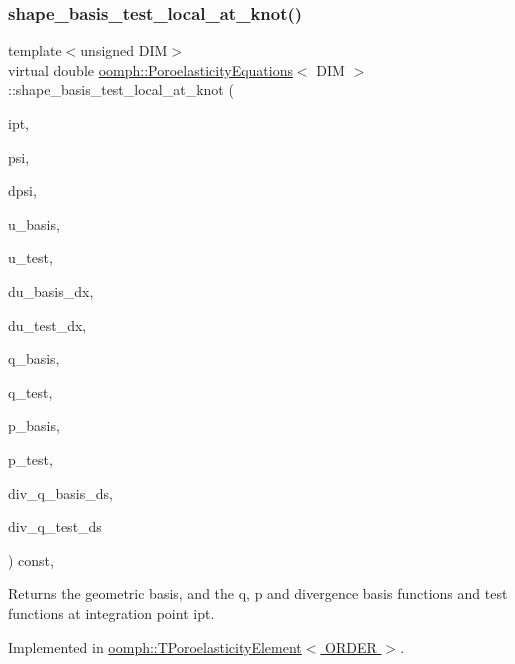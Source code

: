 \subsubsection{\texorpdfstring{shape\+\_\+basis\+\_\+test\+\_\+local\+\_\+at\+\_\+knot()}{shape\_basis\_test\_local\_at\_knot()}}
{\footnotesize\ttfamily template$<$unsigned D\+IM$>$ \\
virtual double \hyperlink{classoomph_1_1PoroelasticityEquations}{oomph\+::\+Poroelasticity\+Equations}$<$ D\+IM $>$\+::shape\+\_\+basis\+\_\+test\+\_\+local\+\_\+at\+\_\+knot (\begin{DoxyParamCaption}\item[{const unsigned \&}]{ipt,  }\item[{\hyperlink{classoomph_1_1Shape}{Shape} \&}]{psi,  }\item[{\hyperlink{classoomph_1_1DShape}{D\+Shape} \&}]{dpsi,  }\item[{\hyperlink{classoomph_1_1Shape}{Shape} \&}]{u\+\_\+basis,  }\item[{\hyperlink{classoomph_1_1Shape}{Shape} \&}]{u\+\_\+test,  }\item[{\hyperlink{classoomph_1_1DShape}{D\+Shape} \&}]{du\+\_\+basis\+\_\+dx,  }\item[{\hyperlink{classoomph_1_1DShape}{D\+Shape} \&}]{du\+\_\+test\+\_\+dx,  }\item[{\hyperlink{classoomph_1_1Shape}{Shape} \&}]{q\+\_\+basis,  }\item[{\hyperlink{classoomph_1_1Shape}{Shape} \&}]{q\+\_\+test,  }\item[{\hyperlink{classoomph_1_1Shape}{Shape} \&}]{p\+\_\+basis,  }\item[{\hyperlink{classoomph_1_1Shape}{Shape} \&}]{p\+\_\+test,  }\item[{\hyperlink{classoomph_1_1Shape}{Shape} \&}]{div\+\_\+q\+\_\+basis\+\_\+ds,  }\item[{\hyperlink{classoomph_1_1Shape}{Shape} \&}]{div\+\_\+q\+\_\+test\+\_\+ds }\end{DoxyParamCaption}) const\hspace{0.3cm}{\ttfamily [protected]}, {}}



Returns the geometric basis, and the q, p and divergence basis functions and test functions at integration point ipt. 



Implemented in \hyperlink{classoomph_1_1TPoroelasticityElement_a26cc12dec0a90720215f1d12d60ce936}{oomph\+::\+T\+Poroelasticity\+Element$<$ O\+R\+D\+E\+R $>$}.



